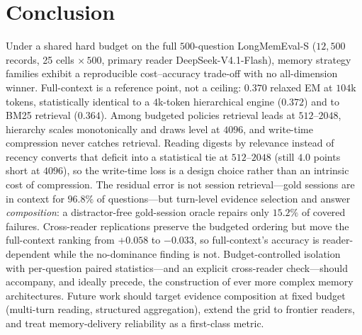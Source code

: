 \documentclass{article} %
\begin{document}
\section{Conclusion}
\label{sec:concl}
Under a shared hard budget on the full $500$-question LongMemEval-S ($12{,}500$ records, 25
cells $\times\,500$, primary reader DeepSeek-V4.1-Flash), memory strategy families exhibit a
reproducible cost--accuracy trade-off with no all-dimension winner. Full-context is a
reference point, not a ceiling: $0.370$ relaxed EM at $104$k tokens, statistically identical
to a $4$k-token hierarchical engine ($0.372$) and to BM25 retrieval ($0.364$). Among budgeted
policies retrieval leads at $512$--$2048$, hierarchy scales monotonically and draws level at
$4096$, and write-time compression never catches retrieval. Reading digests by relevance
instead of recency converts that deficit into a statistical tie at $512$--$2048$ (still $4.0$
points short at $4096$), so the write-time loss is a design choice rather than an intrinsic
cost of compression.
The residual error is not session retrieval---gold sessions are in context for $96.8\%$ of
questions---but turn-level evidence selection and answer \emph{composition}: a
distractor-free gold-session oracle repairs only $15.2\%$ of covered failures. Cross-reader
replications preserve the budgeted ordering but move the full-context ranking from $+0.058$
to $-0.033$, so full-context's accuracy is reader-dependent while the no-dominance finding is
not. Budget-controlled isolation with per-question paired statistics---and an explicit
cross-reader check---should accompany, and ideally precede, the construction of ever more
complex memory architectures. Future work should target evidence composition at fixed budget
(multi-turn reading, structured aggregation), extend the grid to frontier readers, and treat
memory-delivery reliability as a first-class metric.

{\scriptsize


}

\appendix
\footnotesize
\end{document}
